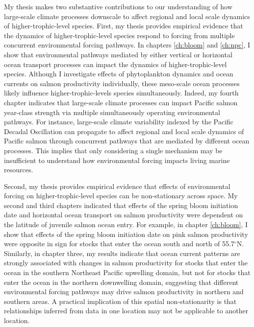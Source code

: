 My thesis makes two substantive contributions to our understanding of how
large-scale climate processes downscale to affect regional and local scale
dynamics of higher-trophic-level species. First, my thesis provides empirical
evidence that the dynamics of higher-trophic-level species respond to forcing
from multiple concurrent environmental forcing pathways. In chapters
\ref{ch:bloom} and \ref{ch:npc}, I show that environmental pathways mediated by
either vertical or horizontal ocean transport processes can impact the dynamics
of higher-trophic-level species. Although I investigate effects of phytoplankton
dynamics and ocean currents on salmon productivity individually, these
meso-scale ocean processes likely influence higher-trophic-levels species
simultaneously. Indeed, my fourth chapter indicates that large-scale climate
processes can impact Pacific salmon year-class strength via multiple
simultaneously operating environmental pathways. For instance, large-scale
climate variability indexed by the Pacific Decadal Oscillation can propagate to
affect regional and local scale dynamics of Pacific salmon through concurrent
pathways that are mediated by different ocean processes. This implies that only
considering a single mechanism may be insufficient to understand how
environmental forcing impacts living marine resources.

Second, my thesis provides empirical evidence that effects of environmental
forcing on higher-trophic-level species can be non-stationary across space. My
second and third chapters indicated that effects of the spring bloom initiation
date and horizontal ocean transport on salmon productivity were dependent on the
latitude of juvenile salmon ocean entry. For example, in chapter \ref{ch:bloom},
I show that effects of the spring bloom initiation date on pink salmon
productivity were opposite in sign for stocks that enter the ocean south and
north of 55.7$^{\circ}$N. Similarly, in chapter three, my results indicate that
ocean current patterns are strongly associated with changes in salmon
productivity for stocks that enter the ocean in the southern Northeast Pacific
upwelling domain, but not for stocks that enter the ocean in the northern
downwelling domain, suggesting that different environmental forcing pathways may
drive salmon productivity in northern and southern areas. A practical
implication of this spatial non-stationarity is that relationships inferred from
data in one location may not be applicable to another location.


